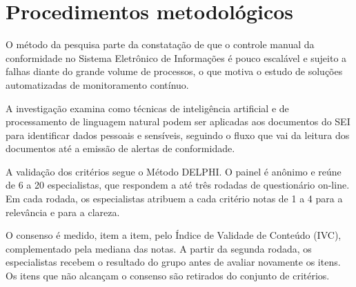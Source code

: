 
\section{Procedimentos metodológicos}

O método da pesquisa parte da constatação de que o controle manual da
conformidade no Sistema Eletrônico de Informações é pouco escalável e sujeito a
falhas diante do grande volume de processos, o que motiva o estudo de soluções
automatizadas de monitoramento contínuo.

A investigação examina como técnicas de inteligência artificial e de
processamento de linguagem natural podem ser aplicadas aos documentos do SEI
para identificar dados pessoais e sensíveis, seguindo o fluxo que vai da leitura
dos documentos até a emissão de alertas de conformidade.

A validação dos critérios segue o Método DELPHI. O painel é anônimo e reúne de
6 a 20 especialistas, que respondem a até três rodadas de questionário on-line.
Em cada rodada, os especialistas atribuem a cada critério notas de 1 a 4 para a
relevância e para a clareza.

O consenso é medido, item a item, pelo Índice de Validade de Conteúdo (IVC),
complementado pela mediana das notas. A partir da segunda rodada, os
especialistas recebem o resultado do grupo antes de avaliar novamente os itens.
Os itens que não alcançam o consenso são retirados do conjunto de critérios.
